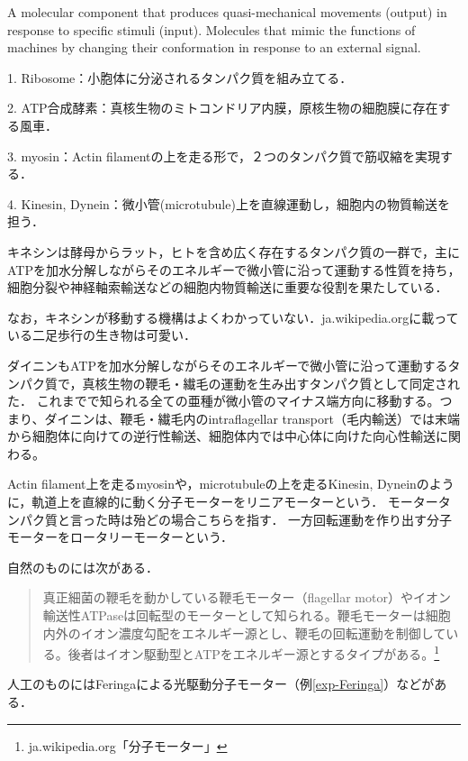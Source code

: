 \documentclass[uplatex, dvipdfmx]{jsreport}
\begin{document}
\begin{definition}
    A molecular component that produces quasi-mechanical movements (output) in response to specific stimuli (input).
    Molecules that mimic the functions of machines by changing their conformation in response to an external signal.
\end{definition}
\begin{example}[分子機械と捉えられる生命現象]
    1. Ribosome：小胞体に分泌されるタンパク質を組み立てる．

    2. ATP合成酵素：真核生物のミトコンドリア内膜，原核生物の細胞膜に存在する風車．

    3. myosin：Actin filamentの上を走る形で，２つのタンパク質で筋収縮を実現する．

    4. Kinesin, Dynein：微小管(microtubule)上を直線運動し，細胞内の物質輸送を担う．
\end{example}
\begin{definition}[Kinesin]
    キネシンは酵母からラット，ヒトを含め広く存在するタンパク質の一群で，主にATPを加水分解しながらそのエネルギーで微小管に沿って運動する性質を持ち，細胞分裂や神経軸索輸送などの細胞内物質輸送に重要な役割を果たしている．

    なお，キネシンが移動する機構はよくわかっていない．ja.wikipedia.orgに載っている二足歩行の生き物は可愛い．
\end{definition}
\begin{definition}[Dynein]
    ダイニンもATPを加水分解しながらそのエネルギーで微小管に沿って運動するタンパク質で，真核生物の鞭毛・繊毛の運動を生み出すタンパク質として同定された．
    これまでで知られる全ての亜種が微小管のマイナス端方向に移動する。つまり、ダイニンは、鞭毛・繊毛内のintraflagellar transport（毛内輸送）では末端から細胞体に向けての逆行性輸送、細胞体内では中心体に向けた向心性輸送に関わる。
\end{definition}
\begin{definition}
    Actin filament上を走るmyosinや，microtubuleの上を走るKinesin, Dyneinのように，軌道上を直線的に動く分子モーターをリニアモーターという．
    モータータンパク質と言った時は殆どの場合こちらを指す．
    一方回転運動を作り出す分子モーターをロータリーモーターという．
\end{definition}
\begin{example}
    自然のものには次がある．
    \begin{quote}
    真正細菌の鞭毛を動かしている鞭毛モーター（flagellar motor）やイオン輸送性ATPaseは回転型のモーターとして知られる。鞭毛モーターは細胞内外のイオン濃度勾配をエネルギー源とし、鞭毛の回転運動を制御している。後者はイオン駆動型とATPをエネルギー源とするタイプがある。\footnote{ja.wikipedia.org「分子モーター」}
    \end{quote}
    人工のものにはFeringaによる光駆動分子モーター（例\ref{exp-Feringa}）などがある．
\end{example}
\end{document}
